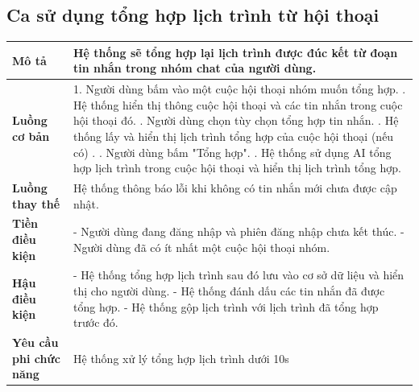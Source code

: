 \subsection{Ca sử dụng tổng hợp lịch trình từ hội thoại}
\vspace{0.5cm}


\noindent 
\begin{tabularx}{\linewidth}{| l | X |} 
\hline 
\textbf{Mô tả} & Hệ thống sẽ tổng hợp lại lịch trình được đúc kết từ đoạn tin nhắn trong nhóm chat của người dùng.  \\ 
\hline 
\textbf{Luồng cơ bản} & 1. Người dùng bấm vào một cuộc hội thoại nhóm muốn tổng hợp. \newline
                        2. Hệ thống hiển thị thông cuộc hội thoại và các tin nhắn trong cuộc hội thoại đó. \newline
                        3. Người dùng chọn tùy chọn tổng hợp tin nhắn. \newline
                        4. Hệ thống lấy và hiển thị lịch trình tổng hợp của cuộc hội thoại (nếu có) . \newline
                        5. Người dùng bấm "Tổng hợp". \newline
                        6. Hệ thống sử dụng AI tổng hợp lịch trình trong cuộc hội thoại và hiển thị lịch trình tổng hợp. \\
                        
\hline 
\textbf{Luồng thay thế} & Hệ thống thông báo lỗi khi không có tin nhắn mới chưa được cập nhật. \\

                       
\hline 
\textbf{Tiền điều kiện} &- Người dùng đang đăng nhập và phiên đăng nhập chưa kết thúc. \newline
                        - Người dùng đã có ít nhất một cuộc hội thoại nhóm. \\
\hline 
\textbf{Hậu điều kiện} & - Hệ thống tổng hợp lịch trình sau đó lưu vào cơ sở dữ liệu và hiển thị cho người dùng. \newline
                        - Hệ thống đánh dấu các tin nhắn đã được tổng hợp. \newline
                        - Hệ thống gộp lịch trình với lịch trình đã tổng hợp trước đó.\\

\hline 
\textbf{Yêu cầu phi chức năng} & Hệ thống xử lý tổng hợp lịch trình dưới 10s  \\ 
\hline 
\end{tabularx}



